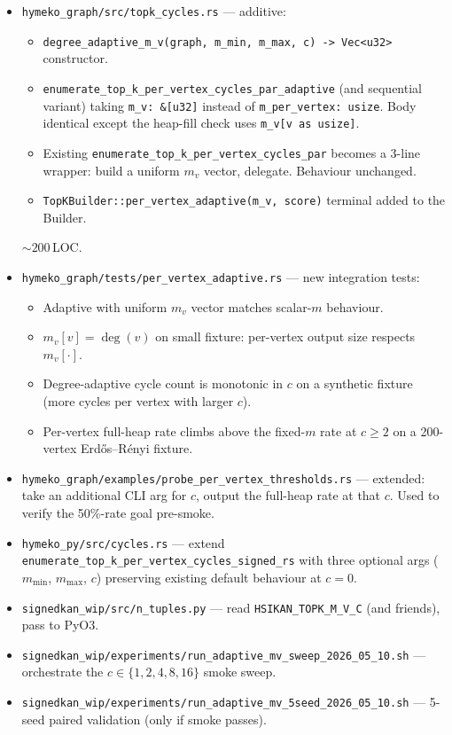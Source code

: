 \documentclass[a4paper,11pt]{article}
\begin{document}
\begin{itemize}
  \item \texttt{hymeko\_graph/src/topk\_cycles.rs} — additive:
    \begin{itemize}
      \item \texttt{degree\_adaptive\_m\_v(graph, m\_min, m\_max, c) -> Vec<u32>}
        constructor.
      \item \texttt{enumerate\_top\_k\_per\_vertex\_cycles\_par\_adaptive}
        (and sequential variant) taking \texttt{m\_v: \&[u32]} instead
        of \texttt{m\_per\_vertex: usize}.  Body identical except
        the heap-fill check uses \texttt{m\_v[v as usize]}.
      \item Existing \texttt{enumerate\_top\_k\_per\_vertex\_cycles\_par}
        becomes a 3-line wrapper: build a uniform $m_v$ vector,
        delegate.  Behaviour unchanged.
      \item \texttt{TopKBuilder::per\_vertex\_adaptive(m\_v, score)}
        terminal added to the Builder.
    \end{itemize}
    $\sim 200$\,LOC.
  \item \texttt{hymeko\_graph/tests/per\_vertex\_adaptive.rs} — new
    integration tests:
    \begin{itemize}
      \item Adaptive with uniform $m_v$ vector matches scalar-$m$
        behaviour.
      \item $m_v[v] = \deg(v)$ on small fixture: per-vertex output
        size respects $m_v[\cdot]$.
      \item Degree-adaptive cycle count is monotonic in $c$ on a
        synthetic fixture (more cycles per vertex with larger $c$).
      \item Per-vertex full-heap rate climbs above the fixed-$m$
        rate at $c \ge 2$ on a 200-vertex Erdős--Rényi fixture.
    \end{itemize}
  \item \texttt{hymeko\_graph/examples/probe\_per\_vertex\_thresholds.rs}
    --- extended: take an additional CLI arg for $c$, output the
    full-heap rate at that $c$.  Used to verify the 50\%-rate goal
    pre-smoke.
  \item \texttt{hymeko\_py/src/cycles.rs} — extend
    \texttt{enumerate\_top\_k\_per\_vertex\_cycles\_signed\_rs} with
    three optional args ($m_\text{min}$, $m_\text{max}$, $c$) preserving
    existing default behaviour at $c = 0$.
  \item \texttt{signedkan\_wip/src/n\_tuples.py} — read
    \texttt{HSIKAN\_TOPK\_M\_V\_C} (and friends), pass to PyO3.
  \item \texttt{signedkan\_wip/experiments/run\_adaptive\_mv\_sweep\_2026\_05\_10.sh}
    — orchestrate the $c \in \{1, 2, 4, 8, 16\}$ smoke sweep.
  \item \texttt{signedkan\_wip/experiments/run\_adaptive\_mv\_5seed\_2026\_05\_10.sh}
    — 5-seed paired validation (only if smoke passes).
\end{itemize}
\end{document}
